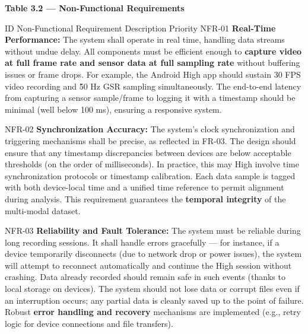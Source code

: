 \documentclass[11pt,a4paper]{report}
\begin{document}
\textbf{Table 3.2 --- Non-Functional Requirements}

  ID Non-Functional Requirement Description Priority
  NFR-01 \textbf{Real-Time Performance:} The system shall operate in real time,
  handling data streams without undue delay.  All components must be efficient enough
  to \textbf{capture video at full frame rate and sensor data at full sampling rate}
  without buffering issues or frame drops.  For example, the Android High
                          app should sustain 30 FPS video recording and \~50 Hz GSR
                          sampling simultaneously.  The end-to-end latency from
                          capturing a sensor sample/frame to logging it with a
                          timestamp should be minimal (well below 100 ms), ensuring a
                          responsive system.

  NFR-02 \textbf{Synchronization Accuracy:} The system's clock synchronization and
  triggering mechanisms shall be precise, as reflected in FR-03.  The design should
  ensure that any timestamp discrepancies between devices are below acceptable
  thresholds (on the order of milliseconds).  In practice, this may High
                          involve time synchronization protocols or timestamp
                          calibration.  Each data sample is tagged with both
                          device-local time and a unified time reference to permit
                          alignment during
                          analysis\cite{CortisolStressIndicator2020}.  This
                          requirement guarantees the \textbf{temporal integrity} of
                          the multi-modal dataset.

  NFR-03 \textbf{Reliability and Fault Tolerance:} The system must be reliable during
  long recording sessions.  It shall handle errors gracefully --- for instance, if a
  device temporarily disconnects (due to network drop or power issues), the system
  will attempt to reconnect automatically and continue the High
                          session without crashing\cite{ElectrodermalActivityWiki}.
                          Data already recorded should remain safe in such events
                          (thanks to local storage on devices).  The system should
                          not lose data or
                          corrupt files even if an interruption occurs; any partial
                          data is cleanly saved up to the point of failure.  Robust
                          \textbf{error handling and recovery} mechanisms are
                          implemented (e.g., retry logic for device connections and
                          file transfers).
\end{document}
